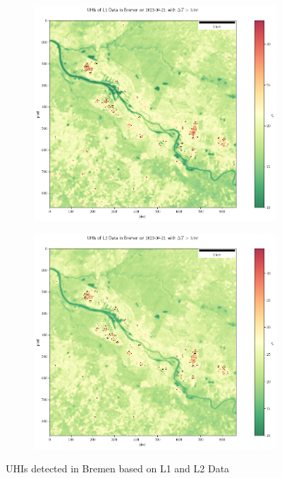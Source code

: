 \documentclass[a4paper, english]{article}
\begin{document}
\begin{figure}[!htbp]
    \centering
    \begin{subfigure}{0.49\textwidth}
    \includegraphics[width=\textwidth]{img/UHIL1HB.png}
    \end{subfigure}
    \begin{subfigure}{0.49\textwidth}
    \includegraphics[width=\textwidth]{img/UHIL2HB.png}
    \end{subfigure}
    \caption{UHIs detected in Bremen\label{fig:UHIsHB} based on L1 and L2 Data}
\end{figure}
\end{document}
